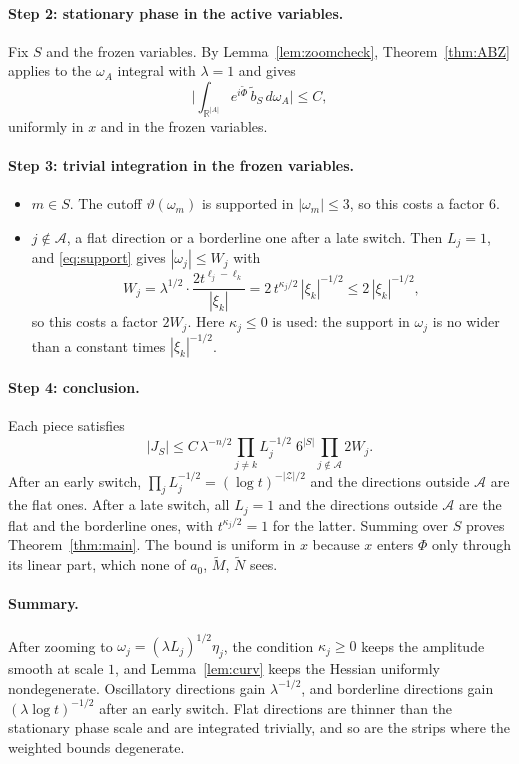 \documentclass[11pt]{article}
\theoremstyle{remark}
\newcommand{\R}{\mathbb{R}}
\begin{document}
\paragraph{Step 2: stationary phase in the active variables.} Fix $S$ and the frozen
variables. By Lemma~\ref{lem:zoomcheck}, Theorem~\ref{thm:ABZ} applies to the
$\omega_A$ integral with $\lambda=1$ and gives
\[
\Big|\int_{\R^{|A|}}e^{i\tilde\Phi}\,\tilde b_S\,d\omega_A\Big|\le C ,
\]
uniformly in $x$ and in the frozen variables.

\paragraph{Step 3: trivial integration in the frozen variables.}
\begin{itemize}
	\item $m\in S$. The cutoff $\vartheta(\omega_m)$ is supported in $|\omega_m|\le3$,
	so this costs a factor $6$.
	\item $j\notin\mathcal A$, a flat direction or a borderline one after a late
	switch. Then $L_j=1$, and \eqref{eq:support} gives $|\omega_j|\le W_j$ with
	\[
	W_j=\lambda^{1/2}\cdot\frac{2t^{\ell_j-\ell_k}}{|\xi_k|}
	=2\,t^{\kappa_j/2}\,|\xi_k|^{-1/2}\le2\,|\xi_k|^{-1/2},
	\]
	so this costs a factor $2W_j$. Here $\kappa_j\le0$ is used: the support in
	$\omega_j$ is no wider than a constant times $|\xi_k|^{-1/2}$.
\end{itemize}

\paragraph{Step 4: conclusion.} Each piece satisfies
\[
|J_S|\le C\,\lambda^{-n/2}\prod_{j\ne k}L_j^{-1/2}\;6^{|S|}\prod_{j\notin\mathcal A}2W_j .
\]
After an early switch, $\prod_jL_j^{-1/2}=(\log t)^{-|\mathcal Z|/2}$ and the
directions outside $\mathcal A$ are the flat ones. After a late switch, all $L_j=1$
and the directions outside $\mathcal A$ are the flat and the borderline ones, with
$t^{\kappa_j/2}=1$ for the latter. Summing over $S$ proves Theorem~\ref{thm:main}.
The bound is uniform in $x$ because $x$ enters $\Phi$ only through its linear part,
which none of $a_0$, $\tilde M$, $\tilde N$ sees.

\paragraph{Summary.} After zooming to $\omega_j=(\lambda L_j)^{1/2}\eta_j$, the
condition $\kappa_j\ge0$ keeps the amplitude smooth at scale $1$, and
Lemma~\ref{lem:curv} keeps the Hessian uniformly nondegenerate. Oscillatory directions
gain $\lambda^{-1/2}$, and borderline directions gain $(\lambda\log t)^{-1/2}$ after
an early switch. Flat directions are thinner than the stationary phase scale and are
integrated trivially, and so are the strips where the weighted bounds degenerate.
\end{document}
